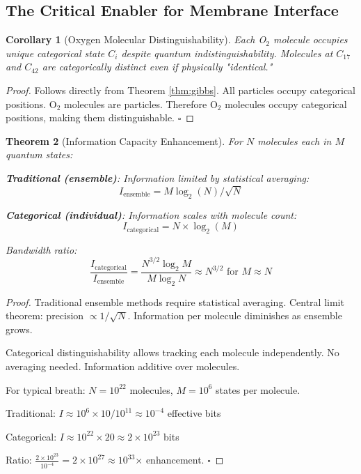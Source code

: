 \documentclass[11pt,a4paper]{article}
\newtheorem{theorem}{Theorem}[section]
\newtheorem{corollary}[theorem]{Corollary}
\theoremstyle{definition}
\theoremstyle{remark}
\begin{document}
\subsection{The Critical Enabler for Membrane Interface}

\begin{corollary}[Oxygen Molecular Distinguishability]
\label{cor:oxygen}
Each O$_2$ molecule occupies unique categorical state $C_i$ despite quantum indistinguishability. Molecules at $C_{17}$ and $C_{42}$ are categorically distinct even if physically "identical."
\end{corollary}

\begin{proof}
Follows directly from Theorem \ref{thm:gibbs}. All particles occupy categorical positions. O$_2$ molecules are particles. Therefore O$_2$ molecules occupy categorical positions, making them distinguishable. $\square$
\end{proof}

\begin{theorem}[Information Capacity Enhancement]
\label{thm:bandwidth}
For $N$ molecules each in $M$ quantum states:

\textbf{Traditional (ensemble)}: Information limited by statistical averaging:
\begin{equation}
I_{\text{ensemble}} = M \log_2(N) / \sqrt{N}
\end{equation}

\textbf{Categorical (individual)}: Information scales with molecule count:
\begin{equation}
I_{\text{categorical}} = N \times \log_2(M)
\end{equation}

Bandwidth ratio:
\begin{equation}
\frac{I_{\text{categorical}}}{I_{\text{ensemble}}} = \frac{N^{3/2} \log_2 M}{M \log_2 N} \approx N^{3/2} \text{ for } M \approx N
\end{equation}
\end{theorem}

\begin{proof}
Traditional ensemble methods require statistical averaging. Central limit theorem: precision $\propto 1/\sqrt{N}$. Information per molecule diminishes as ensemble grows.

Categorical distinguishability allows tracking each molecule independently. No averaging needed. Information additive over molecules.

For typical breath: $N = 10^{22}$ molecules, $M = 10^6$ states per molecule.

Traditional: $I \approx 10^6 \times 10 / 10^{11} \approx 10^{-4}$ effective bits

Categorical: $I \approx 10^{22} \times 20 \approx 2 \times 10^{23}$ bits

Ratio: $\frac{2 \times 10^{23}}{10^{-4}} = 2 \times 10^{27} \approx 10^{33}$× enhancement. $\square$
\end{proof}
\end{document}

